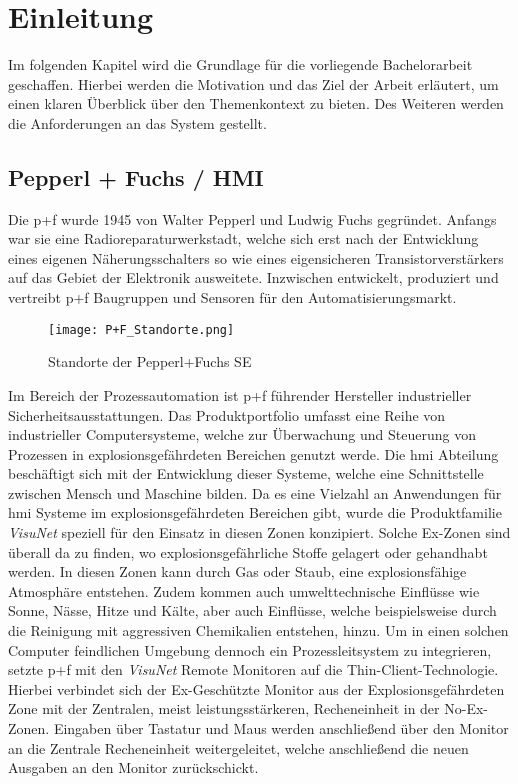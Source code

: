 \chapter{Einleitung}
\vspace{-1.2cm}
Im folgenden Kapitel wird die Grundlage für die vorliegende Bachelorarbeit geschaffen. Hierbei werden die Motivation und das Ziel der Arbeit erläutert, um einen klaren Überblick über den Themenkontext zu bieten. Des Weiteren werden die Anforderungen an das System gestellt.

\section{Pepperl + Fuchs / HMI}\label{sec:PFHMI}
Die \ac{p+f} wurde 1945 von Walter Pepperl und Ludwig Fuchs gegründet. Anfangs war sie eine Radioreparaturwerkstadt, welche sich erst nach der Entwicklung eines eigenen Näherungsschalters so wie eines eigensicheren Transistorverstärkers auf das Gebiet der Elektronik ausweitete. Inzwischen entwickelt, produziert und vertreibt \ac{p+f} Baugruppen und Sensoren für den Automatisierungsmarkt.\\
\vspace{-1cm}
\begin{flushleft}
    \begin{figure}[h!]
        \centering
        \texttt{[image: P+F\_Standorte.png]}
        \caption{Standorte der Pepperl+Fuchs SE}
        \label{fig:StandortePF}
    \end{figure}
\end{flushleft}
Im Bereich der Prozessautomation ist \ac*{p+f} führender Hersteller industrieller Sicherheitsausstattungen. Das Produktportfolio umfasst eine Reihe von industrieller Computersysteme, welche zur Überwachung und Steuerung von Prozessen in explosionsgefährdeten Bereichen genutzt werde. Die \ac{hmi} Abteilung beschäftigt sich mit der Entwicklung dieser Systeme, welche eine Schnittstelle zwischen Mensch und Maschine bilden. Da es eine Vielzahl an Anwendungen für \ac{hmi} Systeme im explosionsgefährdeten Bereichen gibt, wurde die Produktfamilie \textit{VisuNet} speziell für den Einsatz in diesen Zonen konzipiert. Solche Ex-Zonen sind überall da zu finden, wo explosionsgefährliche Stoffe gelagert oder gehandhabt werden. In diesen Zonen kann durch Gas oder Staub, eine explosionsfähige Atmosphäre entstehen. Zudem kommen auch umwelttechnische Einflüsse wie Sonne, Nässe, Hitze und Kälte, aber auch Einflüsse, welche beispielsweise durch die Reinigung mit aggressiven Chemikalien entstehen, hinzu. Um in einen solchen Computer feindlichen Umgebung dennoch ein Prozessleitsystem zu integrieren, setzte \ac{p+f} mit den \textit{VisuNet} Remote Monitoren auf die Thin-Client-Technologie. Hierbei verbindet sich der Ex-Geschützte Monitor aus der Explosionsgefährdeten Zone mit der Zentralen, meist leistungsstärkeren, Recheneinheit in der No-Ex-Zonen. Eingaben über Tastatur und Maus werden anschließend über den Monitor an die Zentrale Recheneinheit weitergeleitet, welche anschließend die neuen Ausgaben an den Monitor zurückschickt.

